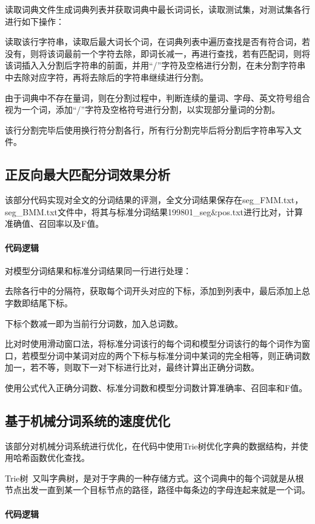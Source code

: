 \documentclass[11pt,a4paper]{article}
\begin{document}
	读取词典文件生成词典列表并获取词典中最长词词长，读取测试集，对测试集各行进行如下操作：
	
	读取该行字符串，读取后最大词长个词，在词典列表中遍历查找是否有符合词，若没有，则将该词最前一个字符去除，即词长减一，再进行查找，若有匹配词，则将该词插入入分割后字符串的前面，并用“/”字符及空格进行分割，在未分割字符串中去除对应字符，再将去除后的字符串继续进行分割。
	
	由于词典中不存在量词，则在分割过程中，判断连续的量词、字母、英文符号组合视为一个词，添加“/”字符及空格符号进行分割，以实现部分量词的分割。
	
	该行分割完毕后使用换行符分割各行，所有行分割完毕后将分割后字符串写入文件。
	
	\subsection{正反向最大匹配分词效果分析}
	该部分代码实现对全文的分词结果的评测，全文分词结果保存在seg\_FMM.txt， seg\_BMM.txt文件中，将其与标准分词结果199801\_seg\&pos.txt进行比对，计算准确值、召回率以及F值。
	
	\paragraph{代码逻辑}
	
	对模型分词结果和标准分词结果同一行进行处理：
	
	去除各行中的分隔符，获取每个词开头对应的下标，添加到列表中，最后添加上总字数即结尾下标。
	
	下标个数减一即为当前行分词数，加入总词数。
	
	比对时使用滑动窗口法，将标准分词该行的每个词和模型分词该行的每个词作为窗口，若模型分词中某词对应的两个下标与标准分词中某词的完全相等，则正确词数加一，若不等，则取下一对下标进行比对，最终计算出正确分词数。
	
	使用公式代入正确分词数、标准分词数和模型分词数计算准确率、召回率和F值。
	
	\subsection{基于机械分词系统的速度优化}
	该部分对机械分词系统进行优化，在代码中使用Trie树优化字典的数据结构，并使用哈希函数优化查找。
	
	Trie树~\citep{thue1912uber}又叫字典树，是对于字典的一种存储方式。这个词典中的每个词就是从根节点出发一直到某一个目标节点的路径，路径中每条边的字母连起来就是一个词。
	
	\paragraph{代码逻辑}
	
\end{document}
